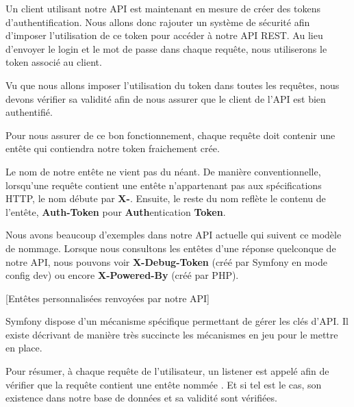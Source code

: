 \documentclass[big]{zmdocument}
\begin{document}
Un client utilisant notre API est maintenant en mesure de créer des tokens d'authentification. Nous allons donc rajouter un système de sécurité afin d'imposer l'utilisation de ce token pour accéder à notre API REST. Au lieu d'envoyer le login et le mot de passe dans chaque requête, nous utiliserons le token associé au client.





Vu que nous allons imposer l'utilisation du token dans toutes les requêtes, nous devons vérifier sa validité afin de nous assurer que le client de l'API est bien authentifié.



Pour nous assurer de ce bon fonctionnement, chaque requête doit contenir une entête  qui contiendra notre token fraichement crée.



\begin{Information}
Le nom de notre entête ne vient pas du néant. De manière conventionnelle, lorsqu'une requête contient une entête n'appartenant pas aux spécifications HTTP, le nom débute par \textbf{X-}. Ensuite, le reste du nom reflète le contenu de l'entête, \textbf{Auth-Token} pour \textbf{Auth}entication \textbf{Token}.
\end{Information}


Nous avons beaucoup d'exemples dans notre API actuelle qui suivent ce modèle de nommage. Lorsque nous consultons les entêtes d'une réponse quelconque de notre API, nous pouvons voir \textbf{X-Debug-Token} (créé par Symfony en mode config dev) ou encore  \textbf{X-Powered-By} (créé par PHP).



[Entêtes personnalisées renvoyées par notre API]


Symfony dispose d'un mécanisme spécifique permettant de gérer les clés d'API. Il existe  décrivant de manière très succincte les mécanismes en jeu pour le mettre en place.



Pour résumer, à chaque requête de l'utilisateur, un listener est appelé afin de vérifier que la requête contient une entête nommée . Et si tel est le cas, son existence dans notre base de données et sa validité sont vérifiées.
\end{document}

